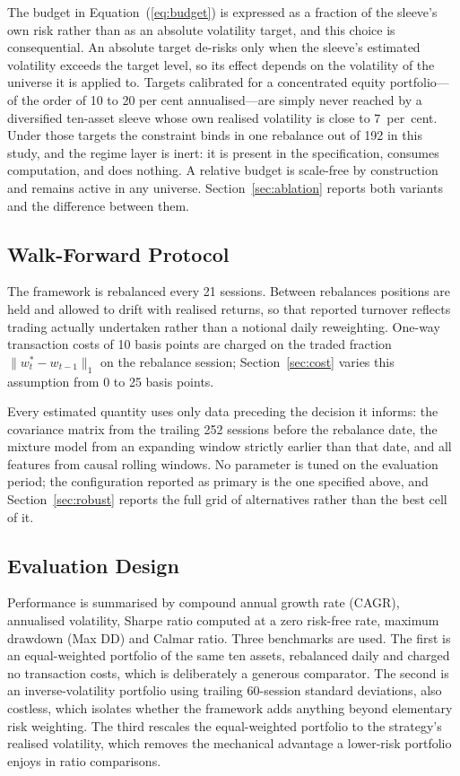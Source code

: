 \documentclass{singlecol-new}
\theoremstyle{TH}{
\newtheorem{lemma}{Lemma}
\newtheorem{theorem}[lemma]{Theorem}
\newtheorem{corrolary}[lemma]{Corrolary}
\newtheorem{conjecture}[lemma]{Conjecture}
\newtheorem{proposition}[lemma]{Proposition}
\newtheorem{claim}[lemma]{Claim}
\newtheorem{stheorem}[lemma]{Wrong Theorem}
\newtheorem{algorithm}{Algorithm}
}
\theoremstyle{THrm}{
\newtheorem{definition}{Definition}[section]
\newtheorem{question}{Question}[section]
\newtheorem{remark}{Remark}
\newtheorem{scheme}{Scheme}
}
\theoremstyle{THhit}{
\newtheorem{case}{Case}[section]
}
\begin{document}
The budget in Equation~(\ref{eq:budget}) is expressed as a fraction of the sleeve's own
risk rather than as an absolute volatility target, and this choice is consequential.
An absolute target de-risks only when the sleeve's estimated volatility exceeds the
target level, so its effect depends on the volatility of the universe it is applied to.
Targets calibrated for a concentrated equity portfolio---of the order of 10 to 20 per
cent annualised---are simply never reached by a diversified ten-asset sleeve whose own
realised volatility is close to 7~per~cent. Under those targets the constraint binds in
one rebalance out of 192 in this study, and the regime layer is inert: it is present in
the specification, consumes computation, and does nothing. A relative budget is
scale-free by construction and remains active in any universe.
Section~\ref{sec:ablation} reports both variants and the difference between them.

\subsection{Walk-Forward Protocol}

The framework is rebalanced every 21 sessions. Between rebalances positions are held
and allowed to drift with realised returns, so that reported turnover reflects trading
actually undertaken rather than a notional daily reweighting. One-way transaction costs
of 10 basis points are charged on the traded fraction $\|w^{\ast}_t - w_{t-1}\|_1$ on
the rebalance session; Section~\ref{sec:cost} varies this assumption from 0 to 25 basis
points.

Every estimated quantity uses only data preceding the decision it informs: the
covariance matrix from the trailing 252 sessions before the rebalance date, the mixture
model from an expanding window strictly earlier than that date, and all features from
causal rolling windows. No parameter is tuned on the evaluation period; the
configuration reported as primary is the one specified above, and
Section~\ref{sec:robust} reports the full grid of alternatives rather than the best
cell of it.

\subsection{Evaluation Design}

Performance is summarised by compound annual growth rate (CAGR), annualised
volatility, Sharpe ratio computed at a zero risk-free rate, maximum drawdown (Max DD)
and Calmar ratio. Three
benchmarks are used. The first is an equal-weighted portfolio of the same ten assets,
rebalanced daily and charged no transaction costs, which is deliberately a generous
comparator. The second is an inverse-volatility portfolio using trailing 60-session
standard deviations, also costless, which isolates whether the framework adds anything
beyond elementary risk weighting. The third rescales the equal-weighted portfolio to
the strategy's realised volatility, which removes the mechanical advantage a
lower-risk portfolio enjoys in ratio comparisons.
\end{document}
